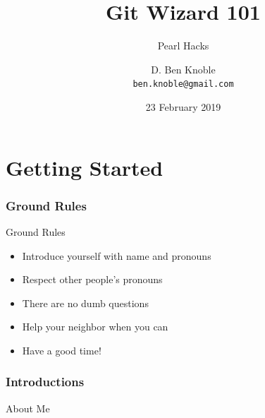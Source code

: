 \documentclass{beamer}
\title{Git Wizard 101}
\subtitle{Pearl Hacks}
\author{D. Ben Knoble \\ \texttt{ben.knoble@gmail.com}}
\institute{UNC Chapel Hill}
\date{23 February 2019}
\theoremstyle{example}
\begin{document}

\frame{\titlepage}

\part{Getting Started}
\frame{\partpage}
\frame{\tableofcontents[part=1]}

\section{Ground Rules}
\begin{frame}{Ground Rules}
    \begin{itemize}
        \item Introduce yourself with name and pronouns
        \item Respect other people’s pronouns
        \item There are no dumb questions
        \item Help your neighbor when you can
        \item Have a good time!
    \end{itemize}
\end{frame}

\section{Introductions}
\begin{frame}{About Me}
\end{frame}
\end{document}

